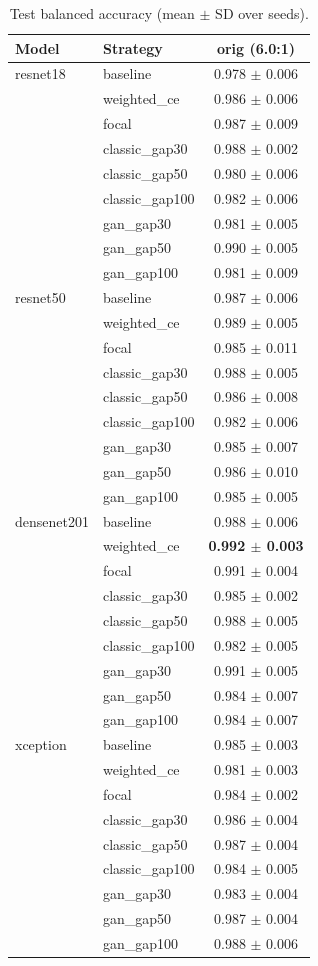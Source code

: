 \begin{table}[htbp]
\centering
\caption{Test balanced accuracy (mean $\pm$ SD over seeds).}
\label{tab:balanced_accuracy}
\begin{tabular}{llc}
\toprule
Model & Strategy & orig (6.0:1) \\
\midrule
resnet18 & baseline & 0.978 $\pm$ 0.006 \\
 & weighted\_ce & 0.986 $\pm$ 0.006 \\
 & focal & 0.987 $\pm$ 0.009 \\
 & classic\_gap30 & 0.988 $\pm$ 0.002 \\
 & classic\_gap50 & 0.980 $\pm$ 0.006 \\
 & classic\_gap100 & 0.982 $\pm$ 0.006 \\
 & gan\_gap30 & 0.981 $\pm$ 0.005 \\
 & gan\_gap50 & 0.990 $\pm$ 0.005 \\
 & gan\_gap100 & 0.981 $\pm$ 0.009 \\
\addlinespace
resnet50 & baseline & 0.987 $\pm$ 0.006 \\
 & weighted\_ce & 0.989 $\pm$ 0.005 \\
 & focal & 0.985 $\pm$ 0.011 \\
 & classic\_gap30 & 0.988 $\pm$ 0.005 \\
 & classic\_gap50 & 0.986 $\pm$ 0.008 \\
 & classic\_gap100 & 0.982 $\pm$ 0.006 \\
 & gan\_gap30 & 0.985 $\pm$ 0.007 \\
 & gan\_gap50 & 0.986 $\pm$ 0.010 \\
 & gan\_gap100 & 0.985 $\pm$ 0.005 \\
\addlinespace
densenet201 & baseline & 0.988 $\pm$ 0.006 \\
 & weighted\_ce & \textbf{0.992 $\pm$ 0.003} \\
 & focal & 0.991 $\pm$ 0.004 \\
 & classic\_gap30 & 0.985 $\pm$ 0.002 \\
 & classic\_gap50 & 0.988 $\pm$ 0.005 \\
 & classic\_gap100 & 0.982 $\pm$ 0.005 \\
 & gan\_gap30 & 0.991 $\pm$ 0.005 \\
 & gan\_gap50 & 0.984 $\pm$ 0.007 \\
 & gan\_gap100 & 0.984 $\pm$ 0.007 \\
\addlinespace
xception & baseline & 0.985 $\pm$ 0.003 \\
 & weighted\_ce & 0.981 $\pm$ 0.003 \\
 & focal & 0.984 $\pm$ 0.002 \\
 & classic\_gap30 & 0.986 $\pm$ 0.004 \\
 & classic\_gap50 & 0.987 $\pm$ 0.004 \\
 & classic\_gap100 & 0.984 $\pm$ 0.005 \\
 & gan\_gap30 & 0.983 $\pm$ 0.004 \\
 & gan\_gap50 & 0.987 $\pm$ 0.004 \\
 & gan\_gap100 & 0.988 $\pm$ 0.006 \\
\bottomrule
\end{tabular}
\end{table}